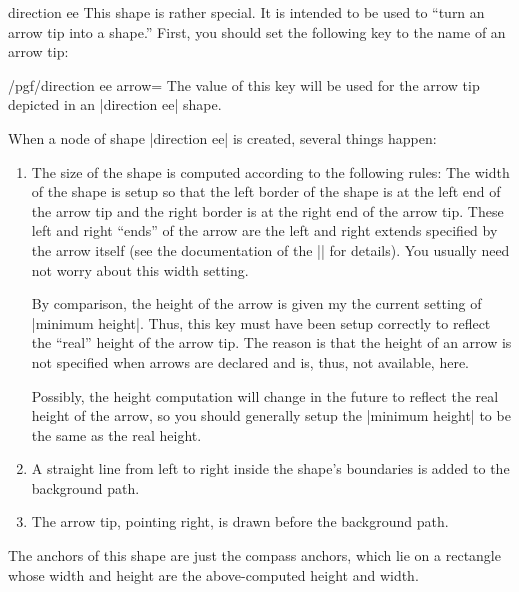 \begin{shape}{direction ee}
  This shape is rather special. It is intended to be used to ``turn an
  arrow tip into a shape.'' First, you should set the following key to
  the name of an arrow tip:
  \begin{key}{/pgf/direction ee arrow=}
    The value of this key will be used for the arrow tip depicted in
    an |direction ee| shape.
  \end{key}
  When a node of shape |direction ee| is created, several things
  happen:
  \begin{enumerate}
  \item The size of the shape is computed according to the following
    rules: The width of the shape is setup so that the left border of
    the shape is at the left end of the arrow tip and the right border
    is at the right end of the arrow tip. These left and right
    ``ends'' of the arrow are the left and right extends specified by
    the arrow itself (see the documentation of the |\pgfarrowsdeclare|
    for details). You usually need not worry about this width
    setting.

    By comparison, the height of the arrow is given my the current
    setting of |minimum height|. Thus, this key must have been setup
    correctly to reflect the ``real'' height of the arrow tip. The
    reason is that the height of an arrow is not specified when arrows
    are declared and is, thus, not available, here.

    Possibly, the height computation will change in the future to
    reflect the real height of the arrow, so you should generally
    setup the |minimum height| to be the same as the real height.
  \item A straight line from left to right inside the shape's
    boundaries is added to the background path.
  \item The arrow tip, pointing right, is drawn before the background
    path. 
  \end{enumerate}
  The anchors of this shape are just the compass anchors, which lie on
  a rectangle whose width and height are the above-computed height and
  width.
  
\begin{codeexample}[]
\end{codeexample}


\end{shape}

